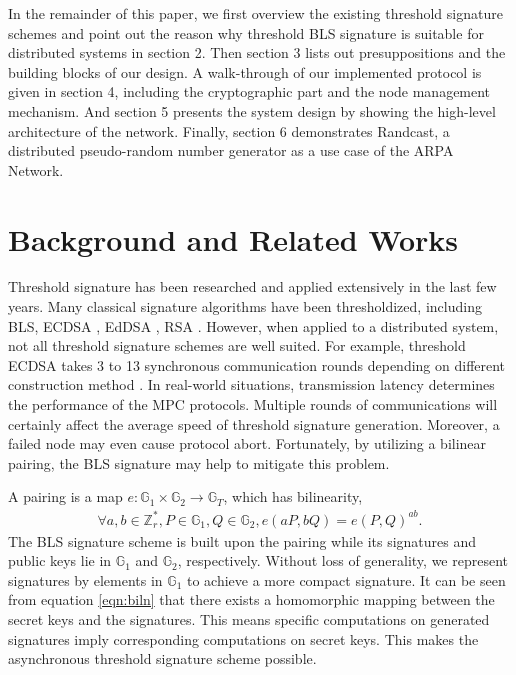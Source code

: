 \documentclass[11pt]{article}
\begin{document}
In the remainder of this paper, we first overview the existing threshold signature schemes and point out the reason why threshold BLS signature is suitable for distributed systems in section 2. Then section 3 lists out presuppositions and the building blocks of our design. A walk-through of our implemented protocol is given in section 4, including the cryptographic part and the node management mechanism. And section 5 presents the system design by showing the high-level architecture of the network. Finally, section 6 demonstrates Randcast, a distributed pseudo-random number generator as a use case of the ARPA Network.

\section{Background and Related Works}

Threshold signature has been researched and applied extensively in the last few years. Many classical signature algorithms have been thresholdized, including BLS, ECDSA \cite{gennaro2018fast}, EdDSA \cite{stinson2001provably}, RSA \cite{damgaard2001practical}. However, when applied to a distributed system, not all threshold signature schemes are well suited. For example, threshold ECDSA takes 3 to 13 synchronous communication rounds depending on different construction method \cite{aumasson2020survey}. In real-world situations, transmission latency determines the performance of the MPC protocols. Multiple rounds of communications will certainly affect the average speed of threshold signature generation. Moreover, a failed node may even cause protocol abort. Fortunately, by utilizing a bilinear pairing, the BLS signature may help to mitigate this problem.

A pairing is a map $e:\mathbb{G}_1 \times \mathbb{G}_2 \to \mathbb{G}_T$, which has bilinearity, 
\begin{align}\label{eqn:biln}
    \forall a,b \in \mathbb{Z}_r^*, P \in \mathbb{G}_1, Q \in \mathbb{G}_2, e(aP,bQ)=e(P,Q)^{ab}.
\end{align}
The BLS signature scheme is built upon the pairing while its signatures and public keys lie in $\mathbb{G}_1$ and $\mathbb{G}_2$, respectively. Without loss of generality, we represent signatures by elements in $\mathbb{G}_1$ to achieve a more compact signature. It can be seen from equation \ref{eqn:biln} that there exists a homomorphic mapping between the secret keys and the signatures. This means specific computations on generated signatures imply corresponding computations on secret keys. This makes the asynchronous threshold signature scheme possible.
\end{document}
